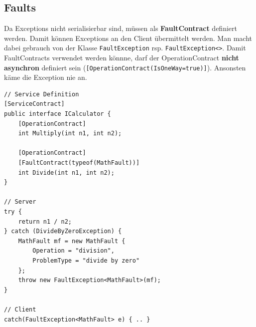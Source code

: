 \subsection{Faults}
Da Exceptions nicht serialisierbar sind, müssen als \textbf{FaultContract} definiert werden. Damit können Exceptions an den Client übermittelt werden. Man macht dabei gebrauch von der Klasse \lstinline|FaultException| rsp. \lstinline|FaultException<>|. Damit FaultContracts verwendet werden könnne, darf der OperationContract \textbf{nicht asynchron} definiert sein (\lstinline|[OperationContract(IsOneWay=true)]|). Ansonsten käme die Exception nie an.
\begin{lstlisting}[caption=Data Contract]
// Service Definition
[ServiceContract]
public interface ICalculator {
	[OperationContract]
	int Multiply(int n1, int n2);
	
	[OperationContract]
	[FaultContract(typeof(MathFault))]
	int Divide(int n1, int n2);
}

// Server 
try { 
	return n1 / n2; 
} catch (DivideByZeroException) {
	MathFault mf = new MathFault {
		Operation = "division",
		ProblemType = "divide by zero"
	};
	throw new FaultException<MathFault>(mf);
}

// Client
catch(FaultException<MathFault> e) { .. }
\end{lstlisting}

